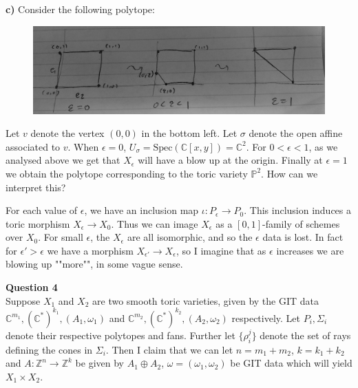 \documentclass{article}
\newcommand{\C}{\mathbb{C}}
\newcommand{\Z}{\mathbb{Z}}
\newcommand{\Spec}{\text{Spec}}
\begin{document}
	\noindent\textbf{c)} Consider the following polytope:

	\begin{figure}[h]
		\centering
		\includegraphics[width=0.8\linewidth]{polytope.jpg}
	\end{figure}
	Let $v$ denote the vertex $(0,0)$ in the bottom left. Let $\sigma$ denote the open affine associated to $v$. When $\epsilon=0$, $U_\sigma=\Spec(\C[x,y])=\C^2$. For $0<\epsilon<1$, as we analysed above we get that $X_\epsilon$ will have a blow up at the origin. Finally at $\epsilon=1$ we obtain the polytope corresponding to the toric variety $\mathbb{P}^2$. How can we interpret this? \vspace{1em}

	For each value of $\epsilon$, we have an inclusion map $\iota:P_\epsilon \to P_0$. This inclusion induces a toric morphism $X_\epsilon \to X_0$. Thus we can image $X_\epsilon$ as a $[0,1]$-family of schemes over $X_0$. For small $\epsilon$, the $X_\epsilon$ are all isomorphic, and so the $\epsilon$ data is lost. In fact for $\epsilon'>\epsilon$ we have a morphism $X_{\epsilon'}\to X_{\epsilon}$, so I imagine that as $\epsilon$ increases we are blowing up ""more"", in some vague sense.
\pagebreak

\noindent \textbf{Question 4} \\
Suppose $X_1$ and $X_2$ are two smooth toric varieties, given by the GIT data $\C^{m_1}, (\C^\ast)^{k_1}, (A_1, \omega_1)$ and $\C^{m_2}, (\C^\ast)^{k_2}, (A_2, \omega_2)$ respectively. Let $P_i, \Sigma_i$ denote their respective polytopes and fans. Further let $\{\rho_i^j\}$ denote the set of rays defining the cones in $\Sigma_i$. Then I claim that we can let $n=m_1+m_2$, $k=k_1+k_2$ and $A:\Z^n \to \Z^k$ be given by $A_1\oplus A_2$, $\omega = (\omega_1,\omega_2)$ be GIT data which will yield $X_1\times X_2$. \vspace*{1em}
\end{document}
